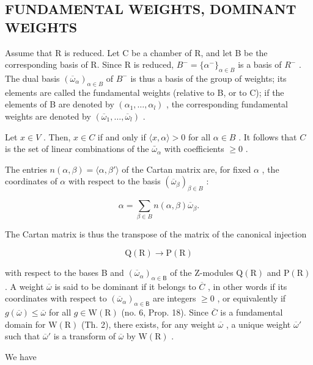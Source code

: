 \subsection{FUNDAMENTAL WEIGHTS, DOMINANT WEIGHTS}

Assume that R is reduced. Let C be a chamber of R, and let B be the corresponding basis of R. Since R is reduced, \(B^{-} = \{\alpha^{-}\}_{\alpha \in B}\) is a basis of \(R^{-}\) . The dual basis \((\overline{\omega}_{\alpha})_{\alpha \in B}\) of \(B^{-}\) is thus a basis of the group of weights; its elements are called the fundamental weights (relative to B, or to C); if the elements of B are denoted by \((\alpha_{1}, \ldots, \alpha_{l})\) , the corresponding fundamental weights are denoted by \((\overline{\omega}_{1}, \ldots, \overline{\omega}_{l})\) .

Let \(x \in V\) . Then, \(x \in C\) if and only if \(\langle x, \alpha \rangle > 0\) for all \(\alpha \in B\) . It follows that \(C\) is the set of linear combinations of the \(\bar{\omega}_{\alpha}\) with coefficients \(\geqslant 0\) .

The entries \(n(\alpha, \beta) = \langle \alpha, \beta' \rangle\) of the Cartan matrix are, for fixed \(\alpha\) , the coordinates of \(\alpha\) with respect to the basis \((\overline{\omega}_{\beta})_{\beta \in B}\) :

\[
\alpha = \sum_ {\beta \in B} n (\alpha , \beta) \overline {{\omega}} _ {\beta}.\tag{14}
\]

The Cartan matrix is thus the transpose of the matrix of the canonical injection

\[
\mathrm{Q} (\mathrm{R}) \rightarrow \mathrm{P} (\mathrm{R})
\]

with respect to the bases B and \((\overline{\omega}_{\alpha})_{\alpha\in\mathsf{B}}\) of the Z-modules \(\mathrm{Q}(\mathrm{R})\) and \(\mathrm{P}(\mathrm{R})\) . A weight \(\overline{\omega}\) is said to be dominant if it belongs to \(\overline{C}\) , in other words if its coordinates with respect to \((\overline{\omega}_{\alpha})_{\alpha\in\mathsf{B}}\) are integers \(\geqslant0\) , or equivalently if \(g(\overline{\omega})\leqslant\overline{\omega}\) for all \(g\in\mathrm{W}(\mathrm{R})\) (no. 6, Prop. 18). Since \(\overline{C}\) is a fundamental domain for \(\mathrm{W(R)}\) (Th. 2), there exists, for any weight \(\overline{\omega}\) , a unique weight \(\overline{\omega}'\) such that \(\overline{\omega}'\) is a transform of \(\overline{\omega}\) by \(\mathrm{W(R)}\) .

We have

